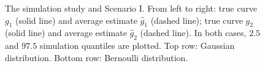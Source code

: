 \begin{figure}[htb]
	\vspace{-0.5cm}
\centering
{}
  \vspace{-0.25cm}
\caption{The simulation study and Scenario I. From left to right: true curve $g_1$ (solid line) and average estimate $\hat{g}_1$ (dashed line); true curve $g_2$ (solid line) and average estimate $\hat{g}_2$ (dashed line). In both cases, $2.5$ and $97.5$ simulation quantiles are plotted. Top row: Gaussian distribution. Bottom row: Bernoulli distribution. \label{simu-sceI}}
\end{figure}

